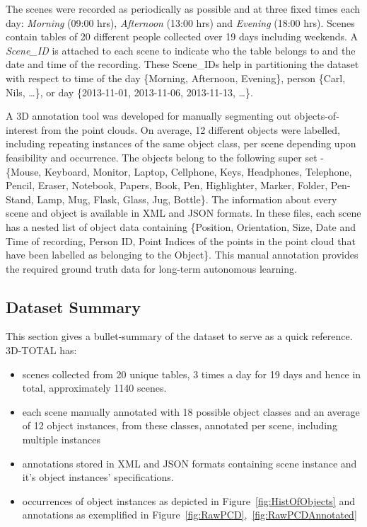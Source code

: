 \documentclass[letterpaper, 10 pt, conference]{ieeeconf}
\begin{document}
The scenes were recorded as periodically as possible and at three fixed times each day: \emph{Morning} (09:00 hrs), \emph{Afternoon} (13:00 
hrs) and \emph{Evening} (18:00 hrs). Scenes contain tables of 20 different people collected over 19 days including weekends. 
A \textit{Scene\_ID} is attached to each scene to indicate who the table belongs to and the date and time of the recording. These Scene\_IDs help in partitioning the dataset with respect to time of the day \{Morning, Afternoon, Evening\}, person \{Carl, Nils, \dots\}, or day \{2013-11-01, 2013-11-06, 2013-11-13, \dots\}.

A 3D annotation tool was developed for manually segmenting out objects-of-interest from the point clouds. On average, 12 different objects 
were labelled, including repeating instances of the same object class, per scene depending upon feasibility and occurrence. The objects 
belong to the following super set - \{Mouse, Keyboard, Monitor, Laptop, Cellphone, Keys, Headphones, Telephone, Pencil, Eraser, Notebook, 
Papers,  Book, Pen, Highlighter, Marker, Folder, Pen-Stand, Lamp, Mug, Flask, Glass, Jug, Bottle\}. The information about every scene and 
object is available in  XML and JSON formats. In these files, each scene has a nested list of object data containing \{Position, Orientation, Size, Date and 
Time of recording, Person ID, Point Indices of the points in the point cloud that have been labelled as belonging to the Object\}. This 
manual annotation provides the required ground truth data for long-term autonomous learning.

\subsection{Dataset Summary}
\label{ssec:Dataset Summary}
This section gives a bullet-summary of the dataset to serve as a quick reference.
\noindent 3D-TOTAL has:
\begin{itemize}
	\item scenes collected from 20 unique tables, 3 times a day for 19 days and hence in total, approximately 1140 scenes.
	\item each scene manually annotated with 18 possible object classes and an average of 12 object instances, from these classes, annotated per scene, including multiple instances
	\item annotations stored in XML and JSON formats containing scene instance and it's object instances' specifications.
	\item occurrences of object instances as depicted in Figure~\ref{fig:HistOfObjects} and annotations as exemplified in Figure~\ref{fig:RawPCD},~\ref{fig:RawPCDAnnotated}
\end{itemize}
\end{document}
